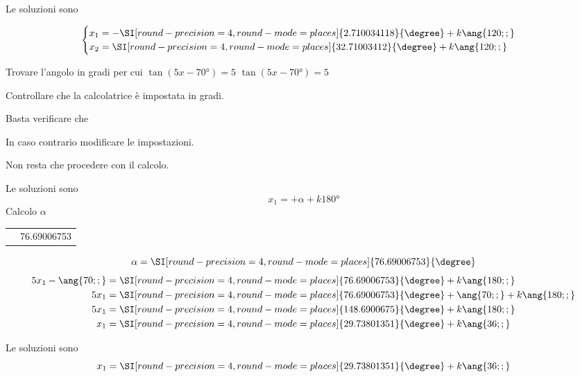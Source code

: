 \begin{exercise}
 	Le soluzioni sono
 	
 	\[\begin{cases}
x_1=-\SI[round-precision=\lungarrotandamento,round-mode=places]{2.710034118}{\degree}+k\ang{120;;}\\
x_2=\SI[round-precision=\lungarrotandamento,round-mode=places]{32.71003412}{\degree}+k\ang{120;;}\\
 	\end{cases}\]
 \end{exercise}
 \begin{exercise}
 	Trovare l'angolo in gradi per cui $\tan (5x-\ang{70;;})=5$
 	\tcblower
 	$\tan (5x-\ang{70;;})=5$
 	
 	Controllare che la calcolatrice è impostata in gradi.
 	
 	Basta verificare che 
 	\testgradi
 	
 	In caso contrario modificare le impostazioni.
 	
 	Non resta che procedere con il calcolo.
 	
 	Le soluzioni sono 
 	\[x_1=+\alpha+k\ang{180;;}\]
 	Calcolo $\alpha$
 	\begin{center}
 		\begin{tabular}{ll}
 			\tastoitan\tasto{\num[round-precision=1,round-mode=places]{5}}
 			\tastouguale&\num[round-precision=\lungarrotandamento,round-mode=places]{76.69006753} 
 		\end{tabular} 
 	\end{center}
 	\[\alpha=\SI[round-precision=\lungarrotandamento,round-mode=places]{76.69006753}{\degree}\]
 	\begin{align*}
 	5x_1-\ang{70;;}&=\SI[round-precision=\lungarrotandamento,round-mode=places]{76.69006753}{\degree}+k\ang{180;;}\\
 	5x_1&=\SI[round-precision=\lungarrotandamento,round-mode=places]{76.69006753}{\degree}+\ang{70;;}+k\ang{180;;}\\
 	5x_1&=\SI[round-precision=\lungarrotandamento,round-mode=places]{148.6900675}{\degree}+k\ang{180;;}\\
 	x_1&=\SI[round-precision=\lungarrotandamento,round-mode=places]{29.73801351}{\degree}+k\ang{36;;}
 	\end{align*}
 	
 	Le soluzioni sono
 \[x_1=\SI[round-precision=\lungarrotandamento,round-mode=places]{29.73801351}{\degree}+k\ang{36;;}\]
 \end{exercise}
